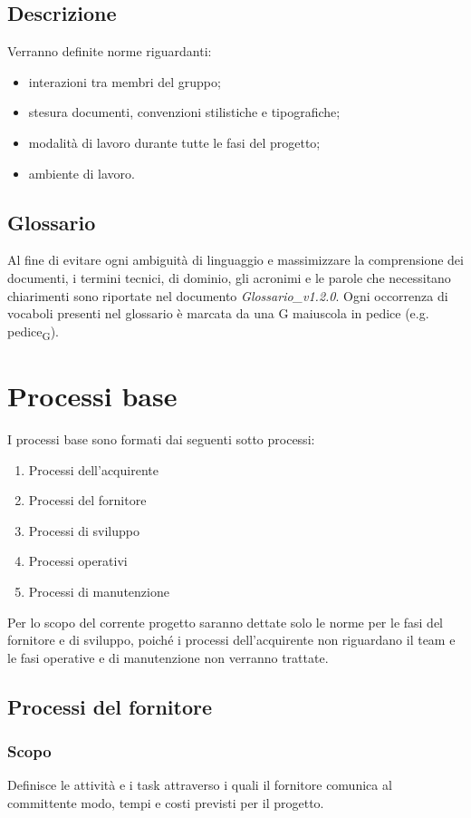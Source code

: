 \documentclass[12pt,a4paper]{article}
\begin{document}
\subsection{Descrizione}
Verranno definite norme riguardanti:
\begin{itemize}
  \item interazioni tra membri del gruppo;
  \item stesura documenti, convenzioni stilistiche e tipografiche;
  \item modalità di lavoro durante tutte le fasi del progetto;
  \item ambiente di lavoro.
\end{itemize}

\subsection{Glossario}
Al fine di evitare ogni ambiguità di linguaggio e massimizzare la comprensione dei
documenti, i termini tecnici, di dominio, gli acronimi e le parole che necessitano chiarimenti sono riportate nel documento \emph{Glossario\_v1.2.0}. Ogni occorrenza di vocaboli presenti nel glossario è marcata da una G maiuscola in pedice (e.g. pedice\textsubscript{G}).

\newpage

\section{Processi base} %
I processi base sono formati dai seguenti sotto processi:
\begin{enumerate}
\item Processi dell'acquirente
\item Processi del fornitore
\item Processi di sviluppo
\item Processi operativi
\item Processi di manutenzione
\end{enumerate}
Per lo scopo del corrente progetto saranno dettate solo le norme per le fasi del fornitore e di sviluppo, poiché i processi  dell'acquirente non riguardano il team e le fasi operative e di manutenzione non verranno trattate.

\subsection{Processi del fornitore}

\subsubsection{Scopo}
Definisce le attività e i task attraverso i quali il fornitore comunica al committente modo, tempi e costi previsti per il progetto.
\end{document}
